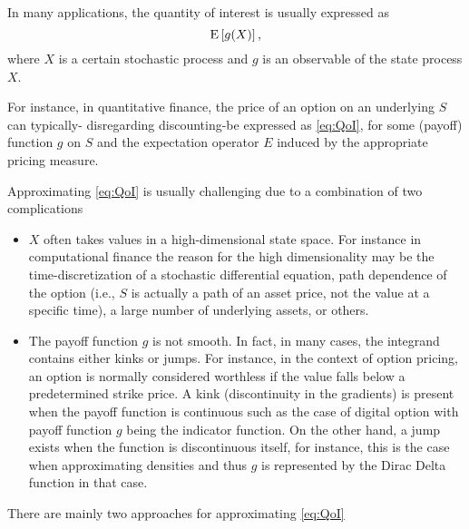 In many  applications, the quantity of interest is usually expressed as 
\begin{equation}\label{eq:QoI}
\mathrm{E}\left[g(X)\right],
\end{equation}
where  $X$ is a certain stochastic process and $g$ is an observable of the state  process $X$.

For instance, in quantitative finance,   the price of an option on an underlying $S$ can typically- disregarding discounting-be expressed as \eqref{eq:QoI}, for some (payoff) function $g$ on $S$ and the expectation operator $E$ induced by the appropriate pricing measure. 

Approximating  \eqref{eq:QoI} is usually challenging due to a combination of two complications
\begin{itemize}
\item $X$ often takes values in a high-dimensional state space.  For instance in computational finance the reason for the high dimensionality may be the time-discretization of a stochastic differential equation,  path dependence of the option (i.e., $S$ is actually a path of an asset price, not the value at a specific time), a large number of underlying assets, or others.
\item The payoff function $g$ is  not smooth. In fact,  in many cases, the  integrand contains either kinks or jumps. For instance, in the context of option pricing,  an option is normally considered worthless if the value falls below a predetermined strike price.  A kink  (discontinuity in the gradients) is present when the payoff function is  continuous such as the case of digital option with payoff function $g$ being the indicator function. On the other hand, a jump  exists  when the function is discontinuous itself, for instance, this is the case when approximating densities and thus $g$ is represented by the Dirac Delta function in that case. 
\end{itemize}
There are mainly two approaches for approximating \eqref{eq:QoI}
